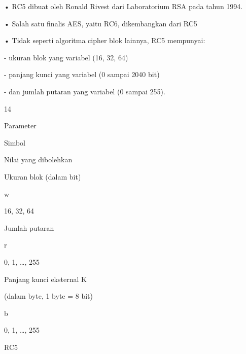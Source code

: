 \documentclass{article}
\begin{document}

• RC5 dibuat oleh Ronald Rivest dari Laboratorium RSA  pada tahun 1994.

• Salah satu finalis AES, yaitu RC6, dikembangkan dari RC5 

• Tidak seperti algoritma cipher blok lainnya, RC5 mempunyai:

 - ukuran blok yang variabel (16, 32, 64)

 - panjang kunci yang variabel (0 sampai 2040 bit)

 - dan jumlah putaran yang variabel (0 sampai 255). 

14


Parameter 

Simbol 

Nilai yang dibolehkan 

Ukuran blok (dalam bit) 

w 

16, 32, 64 

Jumlah putaran 

r 

0, 1, …, 255 

Panjang kunci eksternal K 

(dalam byte, 1 byte = 8 bit) 

b 

0, 1, …, 255 


RC5
\end{document}
